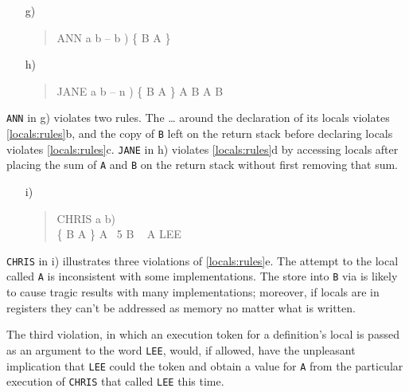 \begin{intro}
\begin{enumerate}
\item[g)] \begin{quote}\ttfamily
	\word{:} ANN  a b -- b )
		   
		\{ B A \}   \word{;}
	\end{quote}

\item[h)] \begin{quote}\ttfamily
	\word{:} JANE  a b -- n )
		\{ B A \} A B \word{+}  A B \word{-} ~ \word{/} \word{;}
	\end{quote}
\end{enumerate}

\texttt{ANN} in g) violates two rules. The  {\ldots} 
around the declaration of its locals violates \ref{locals:rules}b, and
the copy of \texttt{B} left on the return stack before declaring locals
violates \ref{locals:rules}c. \texttt{JANE} in h) violates
\ref{locals:rules}d by accessing locals after placing the sum of
\texttt{A} and \texttt{B} on the return stack without first removing
that sum.

\begin{enumerate}
\item[i)] \begin{quote}\ttfamily
	\word{:} CHRIS  a b) \\
	\tab \{ B A \} \word{[']} A 
		~5 \word{[']} B  \word{!}
		~\word{[}  A \word{]}  LEE
	\word{;}
	\end{quote}
\end{enumerate}

\texttt{CHRIS} in i) illustrates three violations of
\ref{locals:rules}e. The attempt to  the local called
\texttt{A} is inconsistent with some implementations. The store into
\texttt{B} via  is likely to cause tragic results with
many implementations; moreover, if locals are in registers they can't
be addressed as memory no matter what is written.

The third violation, in which an execution token for a definition's
local is passed as an argument to the word \texttt{LEE}, would, if
allowed, have the unpleasant implication that \texttt{LEE} could
 the token and obtain a value for \texttt{A} from the
particular execution of \texttt{CHRIS} that called \texttt{LEE} this
time.

\end{intro}

